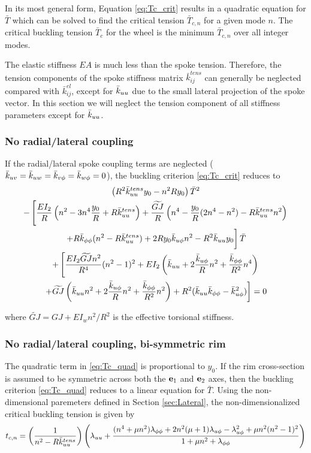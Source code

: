 \documentclass[\rootdir/thesis.tex]{subfiles}
\begin{document}
In its most general form, Equation \eqref{eq:Tc_crit} results in a quadratic equation for $\bar{T}$ which can be solved to find the critical tension $\bar{T}_{c,n}$ for a given mode $n$. The critical buckling tension $\bar{T}_c$ for the wheel is the minimum $\bar{T}_{c,n}$ over all integer modes.

The elastic stiffness $EA$ is much less than the spoke tension. Therefore, the tension components of the spoke stiffness matrix $\bar{k}_{ij}^{tens}$ can generally be neglected compared with $\bar{k}_{ij}^{el}$, except for $\bar{k}_{uu}$ due to the small lateral projection of the spoke vector. In this section we will neglect the tension component of all stiffness parameters except for $\bar{k}_{uu}$.

\subsubsection{No radial/lateral coupling}
If the radial/lateral spoke coupling terms are neglected ($\bar{k}_{uv}=\bar{k}_{uw}=\bar{k}_{v\phi}=\bar{k}_{w\phi}=0$), the buckling criterion \eqref{eq:Tc_crit} reduces to
\begin{multline}
\label{eq:Tc_quad}
\left(R^2\bar{k}_{uu}^{tens}y_0 - n^2Ry_0 \right)\bar{T}^2\\
-\left[\frac{EI_2}{R}\left(n^2 - 3n^4 \frac{y_0}{R} + R\bar{k}_{uu}^{tens}\right)
       +\frac{\widetilde{GJ}}{R}\left(n^4 - \frac{y_0}{R}(2n^4 - n^2) - R\bar{k}_{uu}^{tens}n^2\right) \right.\\
       \left. +R\bar{k}_{\phi\phi} (n^2 - R\bar{k}_{uu}^{tens}) + 2Ry_0\bar{k}_{u\phi} n^2 - R^2\bar{k}_{uu} y_0 \vphantom{\frac12} \right]\bar{T}\\
+\left[\frac{EI_2 \widetilde{GJ} n^2}{R^4}(n^2-1)^2
       +EI_2\left(\bar{k}_{uu} + 2\frac{\bar{k}_{u\phi}}{R}n^2 + \frac{\bar{k}_{\phi\phi}}{R^2}n^4\right) \right.\\
       \left. +\widetilde{GJ}\left(\bar{k}_{uu} n^2 + 2\frac{\bar{k}_{u\phi}}{R}n^2 + \frac{\bar{k}_{\phi\phi}}{R^2}n^2\right)
       +R^2(\bar{k}_{uu}\bar{k}_{\phi\phi} - \bar{k}_{u\phi}^2)\right] = 0
\end{multline}

where $\widetilde{GJ} = GJ + EI_wn^2/R^2$ is the effective torsional stiffness.

\subsubsection{No radial/lateral coupling, bi-symmetric rim}
The quadratic term in \eqref{eq:Tc_quad} is proportional to $y_0$. If the rim cross-section is assumed to be symmetric across both the $\mathbf{e}_1$ and $\mathbf{e}_2$ axes, then the buckling criterion \eqref{eq:Tc_quad} reduces to a linear equation for $\bar{T}$. Using the non-dimensional paremeters defined in Section \ref{sec:Lateral}, the non-dimensionalized critical buckling tension is given by
\begin{equation}
\label{eq:Tcn_lin}
t_{c,n} = \left(\frac{1}{n^2 - R\bar{k}_{uu}^{tens}}\right)
\left(\lambda_{uu}
      +\frac{(n^4 + \mu n^2)\lambda_{\phi\phi}
             +2n^2(\mu + 1)\lambda_{u\phi} - \lambda_{u\phi}^2
             +\mu n^2(n^2-1)^2}
        {1 + \mu n^2 + \lambda_{\phi\phi}}\right)
\end{equation}
\end{document}
